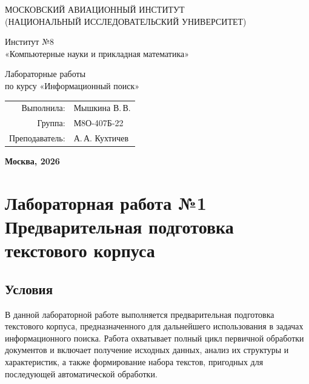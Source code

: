\documentclass[12pt,a4paper]{article}
\begin{document}
\begin{titlepage}
\begin{center}
\bfseries

{\Large МОСКОВСКИЙ АВИАЦИОННЫЙ ИНСТИТУТ\\
(НАЦИОНАЛЬНЫЙ ИССЛЕДОВАТЕЛЬСКИЙ УНИВЕРСИТЕТ)}

\vspace{36pt}

{\large Институт №8\\
«Компьютерные науки и прикладная математика»}

\vspace{72pt}

{\Large Лабораторные работы\\
по курсу «Информационный поиск»}

\end{center}

\vspace{72pt}

\begin{flushright}
\begin{tabular}{rl}
Выполнила: & Мышкина В.\,В. \\
Группа: & М8О-407Б-22 \\
Преподаватель: & А.\,А. Кухтичев \\
\end{tabular}
\end{flushright}

\vfill

\begin{center}
\bfseries
Москва, 2026
\end{center}

\end{titlepage}

\newpage

\section*{Лабораторная работа №1\\
Предварительная подготовка текстового корпуса}

\subsection*{Условия}

В данной лабораторной работе выполняется предварительная подготовка текстового корпуса, предназначенного для дальнейшего использования в задачах информационного поиска. Работа охватывает полный цикл первичной обработки документов и включает получение исходных данных, анализ их структуры и характеристик, а также формирование набора текстов, пригодных для последующей автоматической обработки.
\end{document}
